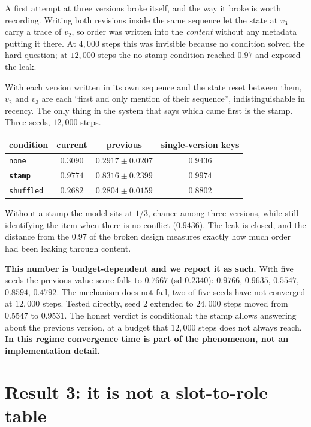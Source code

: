 \documentclass[11pt,a4paper]{article}
\begin{document}
A first attempt at three versions broke itself, and the way it broke is worth recording. Writing both
revisions inside the same sequence let the state at $v_3$ carry a trace of $v_2$, so order was written
into the \emph{content} without any metadata putting it there. At $4{,}000$ steps this was invisible
because no condition solved the hard question; at $12{,}000$ steps the no-stamp condition reached
$0.97$ and exposed the leak.

With each version written in its own sequence and the state reset between them, $v_2$ and $v_3$ are
each ``first and only mention of their sequence'', indistinguishable in recency. The only thing in the
system that says which came first is the stamp. Three seeds, $12{,}000$ steps.

\begin{center}
\begin{tabular}{lccc}
\toprule
condition & current & \textbf{previous} & single-version keys \\
\midrule
\texttt{none} & $0.3090$ & $0.2917 \pm 0.0207$ & $0.9436$ \\
\textbf{\texttt{stamp}} & $0.9774$ & $\mathbf{0.8316 \pm 0.2399}$ & $0.9974$ \\
\texttt{shuffled} & $0.2682$ & $0.2804 \pm 0.0159$ & $0.8802$ \\
\bottomrule
\end{tabular}
\end{center}

Without a stamp the model sits at $1/3$, chance among three versions, while still identifying the item
when there is no conflict ($0.9436$). The leak is closed, and the distance from the $0.97$ of the
broken design measures exactly how much order had been leaking through content.

\textbf{This number is budget-dependent and we report it as such.} With five seeds the previous-value
score falls to $0.7667$ (sd $0.2340$): $0.9766$, $0.9635$, $0.5547$, $0.8594$, $0.4792$. The mechanism
does not fail, two of five seeds have not converged at $12{,}000$ steps. Tested directly, seed 2
extended to $24{,}000$ steps moved from $0.5547$ to $0.9531$. The honest verdict is conditional: the
stamp allows answering about the previous version, at a budget that $12{,}000$ steps does not always
reach. \textbf{In this regime convergence time is part of the phenomenon, not an implementation
detail.}

\section{Result 3: it is not a slot-to-role table}
\end{document}
